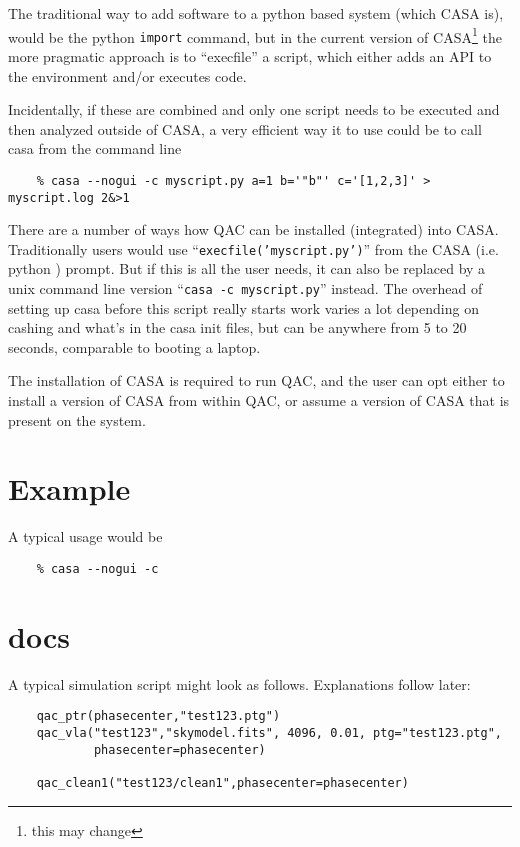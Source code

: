 \documentclass[11pt,twoside]{article}
\begin{document}
The traditional way to add software to a python based system (which CASA is), would be the
python {\tt import} command, but in the current version of CASA\footnote{this may change}
the more pragmatic approach is to ``execfile'' a script, which either adds an API to the
environment and/or executes code.

Incidentally, if these are combined and only one script needs to be executed and then analyzed
outside of CASA, a very efficient way it to use could be to call casa from the command line

\footnotesize
\begin{verbatim}
    % casa --nogui -c myscript.py a=1 b='"b"' c='[1,2,3]' > myscript.log 2&>1
\end{verbatim}
\normalsize

There are a number of ways how QAC can be installed (integrated) into CASA.
Traditionally users would use
``{\tt     execfile('myscript.py')}''
from the CASA (i.e. python ) prompt. But if this is all the user needs, it can
also be replaced by a unix command line version
``{\tt     casa -c myscript.py}''
instead. The overhead of setting up casa before this script really starts work
varies a lot depending on cashing and what's in the casa init files, but can
be anywhere from 5 to 20 seconds, comparable to booting a laptop.

The installation of CASA is required to run QAC, and the user can opt either to install a version
of CASA from within QAC, or assume a version of CASA that is present on the system.

\section{Example}

A typical usage would be

\begin{verbatim}
    % casa --nogui -c 
\end{verbatim}


\section{docs}

A typical simulation script might look as follows. Explanations follow later:

\footnotesize
\begin{verbatim}
    qac_ptr(phasecenter,"test123.ptg")
    qac_vla("test123","skymodel.fits", 4096, 0.01, ptg="test123.ptg",
            phasecenter=phasecenter)
            
    qac_clean1("test123/clean1",phasecenter=phasecenter)
\end{verbatim}
\normalsize
\end{document}
